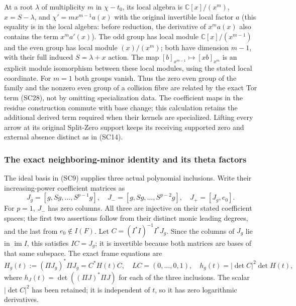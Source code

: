 At a root $\lambda$ of multiplicity $m$ in $\chi-t_0$, its local
algebra is $\mathbb C[x]/(x^m)$, $x=S-\lambda$, and
$\chi'=m x^{m-1}a(x)$ with the original invertible local factor
$a$ (this equality is in the local algebra: before reduction,
the derivative of $x^ma(x)$ also contains the term $x^ma'(x)$).
The odd group has local module
$\mathbb C[x]/(x^{m-1})$ and the even group has local module
$(x)/(x^m)$; both have dimension $m-1$, with their full induced
$S=\lambda+x$ action.  The map
$[b]_{x^{m-1}}\mapsto[xb]_{x^m}$ is an explicit module isomorphism
between these local modules, using the stated local coordinate.
For $m=1$ both groups vanish.
Thus the zero even group of the family and the nonzero even group
of a collision fibre are related by the exact Tor term (SC28),
not by omitting specialization data.  The coefficient maps in
the residue construction commute with base change; this calculation
retains the additional derived term required when their kernels
are specialized.  Lifting every arrow at its original Split-Zero
support keeps its receiving supported zero and external absence
distinct as in (SC14).

\subsubsection{The exact neighboring-minor identity and its theta factors}

The ideal basis in (SC9) supplies three actual polynomial inclusions.
Write their increasing-power coefficient matrices as
\[
 J_g=[g,Sg,\ldots,S^{p-1}g],\quad
 J_-=[g,Sg,\ldots,S^{p-2}g],\quad
 J_+=[J_g,e_0].
 \tag{SC31}
\]
For $p=1$, $J_-$ has zero columns.  All three are injective on their
stated coefficient spaces; the first two assertions follow from
their distinct monic leading degrees, and the last from
$e_0\notin I(F)$.  Let
$C=(I^*I)^{-1}I^*J_g$.  Since the columns of $J_g$ lie in
$\operatorname{im}I$, this satisfies $IC=J_g$; it is invertible
because both matrices are bases of that same subspace.  The exact
frame equations are
\[
 H_g(t):=(\Pi J_g)^*\Pi J_g=C^*H(t)C,
 \quad LC=(0,\ldots,0,1),\quad
 h_g(t)=|\det C|^2\det H(t),
 \tag{SC32}
\]
where $h_J(t)=\det((\Pi J)^*\Pi J)$ for each of the three
inclusions.  The scalar $|\det C|^2$ has been retained; it is
independent of $t$, so it has zero logarithmic derivatives.

